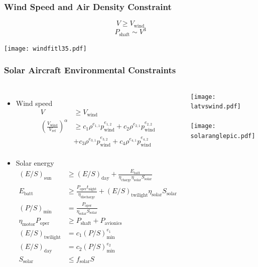 \documentclass{beamer}
\begin{document}
\begin{frame}
    \frametitle{Wind Speed and Air Density Constraint}

    \pause
    \[ V \geq V_{\text{wind}} \]
        \pause
    \[P_{\text{shaft}} \sim V^3 \]

    \pause
    \begin{center}
    \texttt{[image: windfitl35.pdf]}
    \end{center}

\end{frame}


\begin{frame}
    \frametitle{Solar Aircraft Environmental Constraints}
    
    \begin{columns}
    \tiny
    \begin{itemize}
        \item Wind speed
        \begin{align*}
            V & \geq V_{\text{wind}} \\
        \left(\frac{V_{\text{wind}}}{V_{\text{ref}}}\right)^{\alpha} &\geq c_1 \rho^{e_{1,1}}p_{\text{wind}}^{e_{1,2}} + c_2 \rho^{e_{2,1}}p_{\text{wind}}^{e_{2,2}} \\
                                                                     &+ c_3 \rho^{e_{3,1}}p_{\text{wind}}^{e_{3,2}} + c_4 \rho^{e_{4,1}}p_{\text{wind}}^{e_{4,2}} \\
\end{align*}
    
        \item Solar energy
        \begin{align*}
        (E/S)_{\text{sun}}  &\geq (E/S)_{\text{day}} + \frac{E_{\text{batt}}}{\eta_{\text{charge}}\eta_{\text{solar}} S_{\text{solar}}} \\
    E_{\text{batt}} &\geq \frac{P_{\text{oper}}t_{\text{night}}}{\eta_{\text{discharge}}} + (E/S)_{\text{twilight}} \eta_{\text{solar}} S_{\text{solar}} \\
    (P/S)_{\text{min}} &= \frac{P_{\text{oper}}}{\eta_{\text{solar}} S_{\text{solar}}} \\
    \eta_{\text{motor}} P_{\text{oper}} &\geq P_{\text{shaft}} + P_{\text{avionics}}\\
            (E/S)_{\text{twilight}} &= c_1 (P/S)_{\text{min}}^{e_1} \\
            (E/S)_{\text{day}} &= c_2(P/S)_{\text{min}}^{e_2} \\
            S_{\text{solar}} & \leq f_{\text{solar}}S
        \end{align*}
    \end{itemize}
        
    \pause
        \texttt{[image: latvswind.pdf]} \\~\\
        \pause
        \texttt{[image: solaranglepic.pdf]}

\end{columns}

\end{frame}
\end{document}
